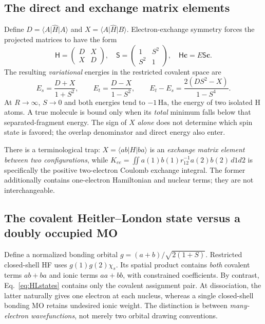 \documentclass[11pt,letterpaper]{article}
\newcommand{\mel}[3]{\langle #1\lvert #2\rvert #3\rangle}
\newcommand{\ha}{\,\mathrm{Ha}}
\begin{document}
\subsection{The direct and exchange matrix elements}
Define $D=\mel A{\hat H}A$ and $X=\mel A{\hat H}B$. Electron-exchange symmetry forces the projected matrices to have the form
\begin{equation}\label{eq:HL-generalized}
\mathsf H=\begin{pmatrix}D&X\\X&D\end{pmatrix},\quad
\mathsf S=\begin{pmatrix}1&S^2\\S^2&1\end{pmatrix},\quad
\mathsf H\mathbf c=E\mathsf S\mathbf c.
\end{equation}
The resulting \emph{variational} energies in the restricted covalent space are
\begin{equation}\label{eq:HLenergies}
\boxed{E_s=\frac{D+X}{1+S^2},\qquad E_t=\frac{D-X}{1-S^2},\qquad
E_t-E_s=\frac{2(DS^2-X)}{1-S^4}.}
\end{equation}
At $R\to\infty$, $S\to0$ and both energies tend to $-1\ha$, the energy of two isolated H atoms. A true molecule is bound only when its \emph{total} minimum falls below that separated-fragment energy. The sign of $X$ \emph{alone} does not determine which spin state is favored; the overlap denominator and direct energy also enter.

There is a terminological trap: $X=\mel{ab}{H}{ba}$ is an \emph{exchange matrix element between two configurations}, while $K_{ee}=\iint a(1)b(1)r_{12}^{-1}a(2)b(2)\,d1d2$ is specifically the positive two-electron Coulomb exchange integral. The former additionally contains one-electron Hamiltonian and nuclear terms; they are not interchangeable.

\subsection{The covalent Heitler--London state versus a doubly occupied MO}
Define a normalized bonding orbital $g=(a+b)/\sqrt{2(1+S)}$. Restricted closed-shell HF uses $g(1)g(2)\chi_s$. Its spatial product contains \emph{both} covalent terms $ab+ba$ and ionic terms $aa+bb$, with constrained coefficients. By contrast, Eq.~\eqref{eq:HLstates} contains only the covalent assignment pair. At dissociation, the latter naturally gives one electron at each nucleus, whereas a single closed-shell bonding MO retains undesired ionic weight. The distinction is between \emph{many-electron wavefunctions}, not merely two orbital drawing conventions.
\end{document}
